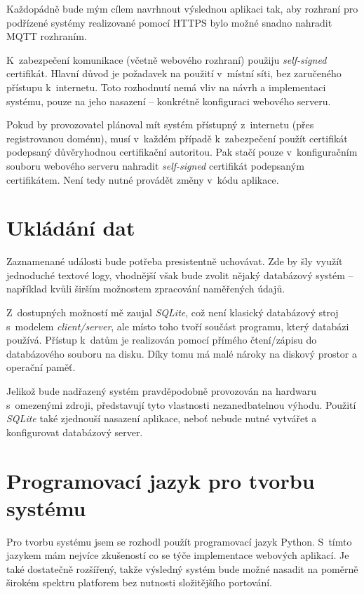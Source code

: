 Každopádně bude mým cílem navrhnout výslednou aplikaci tak, aby rozhraní pro podřízené systémy realizované pomocí HTTPS bylo možné snadno nahradit MQTT rozhraním.

K~zabezpečení komunikace (včetně webového rozhraní) použiju \textit{self-signed} certifikát. Hlavní důvod je požadavek na použití v~místní síti, bez zaručeného přístupu k~internetu. Toto rozhodnutí nemá vliv na návrh a implementaci systému, pouze na jeho nasazení -- konkrétně konfiguraci webového serveru.

Pokud by provozovatel plánoval mít systém přístupný z~internetu (přes registrovanou doménu), musí v~každém případě k~zabezpečení použít certifikát podepsaný důvěryhodnou certifikační autoritou. Pak stačí pouze v~konfiguračním souboru webového serveru nahradit \textit{self-signed} certifikát podepsaným certifikátem. Není tedy nutné provádět změny v~kódu aplikace.

\section{Ukládání dat}

Zaznamenané události bude potřeba presistentně uchovávat. Zde by šly využít jednoduché textové logy, vhodnější však bude zvolit nějaký databázový systém -- například kvůli širším možnostem zpracování naměřených údajů.

Z~dostupných možností mě zaujal \textit{SQLite}, což není klasický databázový stroj s~modelem \textit{client/server}, ale místo toho tvoří součást programu, který databázi používá. Přístup k~datům je realizován pomocí přímého čtení/zápisu do databázového souboru na disku.  Díky tomu má malé nároky na diskový prostor a operační paměť. \cite{sqlite_about}

Jelikož bude nadřazený systém pravděpodobně provozován na hardwaru s~omezenými zdroji, představují tyto vlastnosti nezanedbatelnou výhodu. Použití \textit{SQLite} také zjednouší nasazení aplikace, neboť nebude nutné vytvářet a konfigurovat databázový server.

\section{Programovací jazyk pro tvorbu systému}

Pro tvorbu systému jsem se rozhodl použít programovací jazyk Python. S~tímto jazykem mám nejvíce zkušeností co se týče implementace webových aplikací. Je také dostatečně rozšířený, takže výsledný systém bude možné nasadit na poměrně širokém spektru platforem bez nutnosti složitějšího portování.

